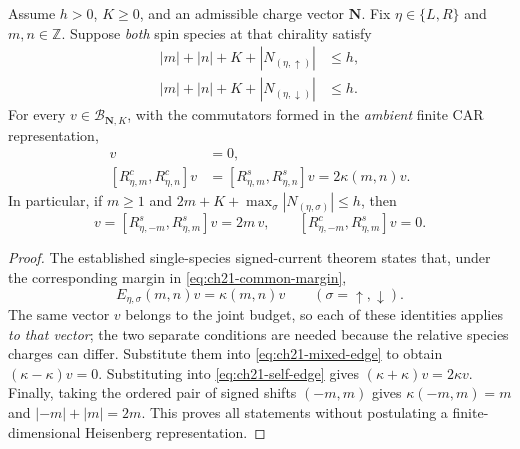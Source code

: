 \begin{theorem}
\label{thm:ch21-budget-ccr}
Assume $h>0$, $K\geq0$, and an admissible charge vector
$\mathbf N$.  Fix $\eta\in\{L,R\}$ and $m,n\in\mathbb Z$.
Suppose \emph{both} spin species at that chirality satisfy
\begin{equation}
 \begin{split}
 |m|+|n|+K+|N_{(\eta,\uparrow)}|&\leq h,\\
 |m|+|n|+K+|N_{(\eta,\downarrow)}|&\leq h.
 \end{split}
 \label{eq:ch21-common-margin}
\end{equation}
For every $v\in\mathcal B_{\mathbf N,K}$, with the commutators
formed in the \emph{ambient} finite CAR representation,
\begin{align}
 [R^c_{\eta,m},R^s_{\eta,n}]v&=0,
   \label{eq:ch21-cross-ccr-budget}\\
 [R^c_{\eta,m},R^c_{\eta,n}]v
   &=[R^s_{\eta,m},R^s_{\eta,n}]v
     =2\kappa(m,n)v.
   \label{eq:ch21-self-ccr-budget}
\end{align}
In particular, if $m\geq1$ and
$2m+K+\max_{\sigma}|N_{(\eta,\sigma)}|\leq h$, then
\begin{equation}
 [R^c_{\eta,-m},R^c_{\eta,m}]v
   =[R^s_{\eta,-m},R^s_{\eta,m}]v=2m\,v,
 \qquad [R^c_{\eta,-m},R^s_{\eta,m}]v=0.
 \label{eq:ch21-two-m}
\end{equation}
\end{theorem}
\begin{proof}
The established single-species signed-current theorem states that,
under the corresponding margin in \eqref{eq:ch21-common-margin},
\begin{equation*}
 E_{\eta,\sigma}(m,n)v=\kappa(m,n)v
 \qquad(\sigma=\uparrow,\downarrow).
\end{equation*}
The same vector $v$ belongs to the joint budget, so each of these
identities applies \emph{to that vector}; the two separate conditions
are needed because the relative species charges can differ.  Substitute
them into \eqref{eq:ch21-mixed-edge} to obtain
$(\kappa-\kappa)v=0$.  Substituting into
\eqref{eq:ch21-self-edge} gives $(\kappa+\kappa)v=2\kappa v$.
Finally, taking the ordered pair of signed shifts $(-m,m)$ gives
$\kappa(-m,m)=m$ and $|{-m}|+|m|=2m$.
This proves all statements without postulating a finite-dimensional
Heisenberg representation.
\end{proof}

